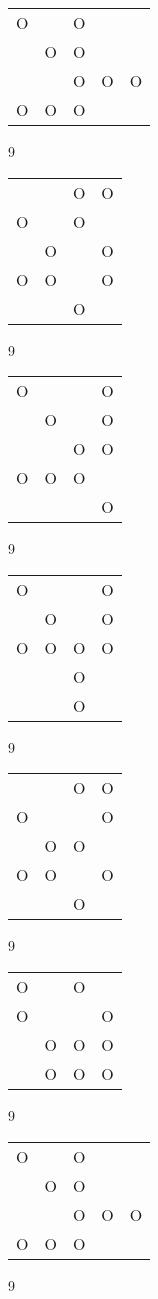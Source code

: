 \begin{tabular}{|m{0.2cm}m{0.2cm}m{0.2cm}m{0.2cm}m{0.2cm}|}\hline
O& &O& & \\
 &O&O& & \\
 & &O&O&O\\
O&O&O& & \\
\hline\end{tabular}9
\begin{tabular}{|m{0.2cm}m{0.2cm}m{0.2cm}m{0.2cm}|}\hline
 & &O&O\\
O& &O& \\
 &O& &O\\
O&O& &O\\
 & &O& \\
\hline\end{tabular}9
\begin{tabular}{|m{0.2cm}m{0.2cm}m{0.2cm}m{0.2cm}|}\hline
O& & &O\\
 &O& &O\\
 & &O&O\\
O&O&O& \\
 & & &O\\
\hline\end{tabular}9
\begin{tabular}{|m{0.2cm}m{0.2cm}m{0.2cm}m{0.2cm}|}\hline
O& & &O\\
 &O& &O\\
O&O&O&O\\
 & &O& \\
 & &O& \\
\hline\end{tabular}9
\begin{tabular}{|m{0.2cm}m{0.2cm}m{0.2cm}m{0.2cm}|}\hline
 & &O&O\\
O& & &O\\
 &O&O& \\
O&O& &O\\
 & &O& \\
\hline\end{tabular}9
\begin{tabular}{|m{0.2cm}m{0.2cm}m{0.2cm}m{0.2cm}|}\hline
O& &O& \\
O& & &O\\
 &O&O&O\\
 &O&O&O\\
\hline\end{tabular}9
\begin{tabular}{|m{0.2cm}m{0.2cm}m{0.2cm}m{0.2cm}m{0.2cm}|}\hline
O& &O& & \\
 &O&O& & \\
 & &O&O&O\\
O&O&O& & \\
\hline\end{tabular}9

